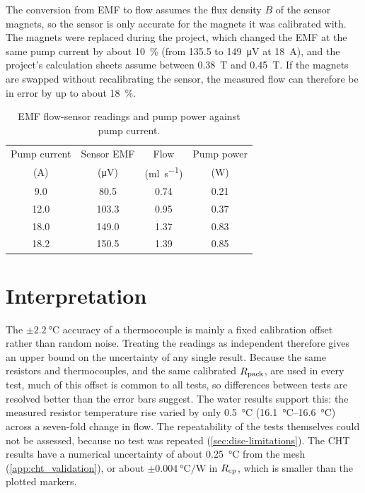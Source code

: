 The conversion from EMF to flow assumes the flux density $B$ of the sensor
magnets, so the sensor is only accurate for the magnets it was calibrated with.
The magnets were replaced during the project, which changed the EMF at the same
pump current by about \SI{10}{\percent} (from 135.5 to \SI{149}{\micro\volt} at
\SI{18}{\ampere}), and the project's calculation sheets assume between
\SI{0.38}{\tesla} and \SI{0.45}{\tesla}. If the magnets are swapped without
recalibrating the sensor, the measured flow can therefore be in error by up to
about \SI{18}{\percent}.

\begin{table}[htbp]
  \centering
  \caption{EMF flow-sensor readings and pump power against pump current.}
  \label{tab:app-emf}
  \small
  \begin{tabular}{@{}cccc@{}}
    \toprule
    Pump current & Sensor EMF & Flow & Pump power \\
    (\si{\ampere}) & (\si{\micro\volt}) & (\si{\milli\litre\per\second}) & (\si{\watt}) \\
    \midrule
    9.0  & 80.5  & 0.74 & 0.21 \\
    12.0 & 103.3 & 0.95 & 0.37 \\
    18.0 & 149.0 & 1.37 & 0.83 \\
    18.2 & 150.5 & 1.39 & 0.85 \\
    \bottomrule
  \end{tabular}
\end{table}

\section{Interpretation}
\label{sec:app-unc-interpretation}

The $\pm\SI{2.2}{\celsius}$ accuracy of a thermocouple is mainly a fixed
calibration offset rather than random noise. Treating the readings as
independent therefore gives an upper bound on the uncertainty of any single
result. Because the same resistors and thermocouples, and the same calibrated
$R_{\mathrm{pack}}$, are used in every test, much of this offset is common to all tests, so
differences between tests are resolved better than the error bars suggest. The
water results support this: the measured resistor temperature rise varied by only
\SI{0.5}{\celsius} (\SIrange{16.1}{16.6}{\celsius}) across a seven-fold change in
flow. The repeatability of the tests themselves could not be assessed, because no
test was repeated (\cref{sec:disc-limitations}). The CHT results have a numerical
uncertainty of about \SI{0.25}{\celsius} from the mesh
(\cref{app:cht_validation}), or about $\pm\SI{0.004}{\celsius\per\watt}$ in
$R_{\mathrm{cp}}$, which is smaller than the plotted markers.
